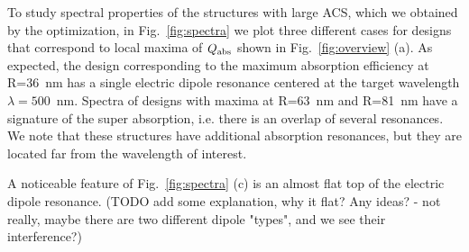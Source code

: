 \documentclass[aps,prl,twocolumn,showpacs,superscriptaddress,groupedaddress]{revtex4-1}
\begin{document}
\begin{figure}
\end{figure}
%
To study spectral properties of the structures with large ACS, which we
obtained by the optimization, in Fig.~\ref{fig:spectra} we plot three
different cases for designs that correspond to local maxima of $Q_{\rm
  abs}$ shown in Fig.~\ref{fig:overview} (a).  As expected, the design
corresponding to the maximum absorption efficiency at R=36~nm has a
single electric dipole resonance centered at the target wavelength
$\lambda=500$~nm. Spectra of designs with maxima at R=63~nm and
R=81~nm have a signature of the super absorption, i.e. there is an
overlap of several resonances.  We note that these structures have
additional absorption resonances, but they are located far from the
wavelength of interest.

A noticeable feature of Fig.~\ref{fig:spectra} (c) is an almost flat
top of the electric dipole resonance. (TODO add some explanation, why
it flat? Any ideas?  - not really, maybe there are two different
dipole "types", and we see their interference?)
\end{document}

